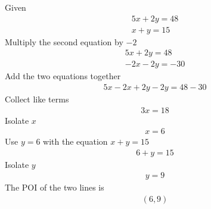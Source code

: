 \begin{questions}

\newpage

\begin{solution}
Given
\begin{gather*}
5x+2y=48\\
x+y=15
\end{gather*}
Multiply the second equation by $-2$
\begin{gather*}
5x+2y=48\\
-2x-2y=-30
\end{gather*}
Add the two equations together
\begin{gather*}
5x-2x+2y-2y=48-30
\end{gather*}
Collect like terms
\begin{gather*}
3x=18
\end{gather*}
Isolate $x$
\begin{gather*}
x=6
\end{gather*}
Use $y=6$ with the equation $x+y=15$
\begin{gather*}
6+y=15
\end{gather*}
Isolate $y$
\begin{gather*}
y=9
\end{gather*}
The POI of the two lines is
\begin{gather*}
(6,9)
\end{gather*}
\end{solution}

\newpage



\newpage


\end{questions}
